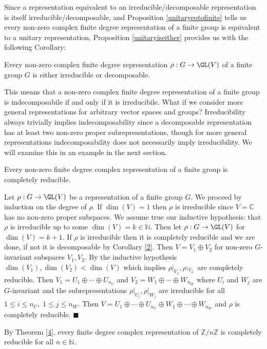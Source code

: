 \documentclass[../Project.tex]{subfiles}
\begin{document}
Since a representation equivalent to an irreducible/decomposable representation is itself irreducible/decomposable, and Proposition \ref{unitaryeqtofinite} tells us every non-zero complex finite degree representation of a finite group is equivalent to a unitary representation, Proposition \ref{unitaryiseither} provides us with the following Corollary: 
\begin{coro}[{\cite[Corollary 3.2.5]{1}}]
\label{2}
	Every non-zero complex finite degree representation $\rho : G \to \GL(V)$ of a finite group $G$ is either irreducible or decomposable.
\end{coro}
This means that a non-zero complex finite degree representation of a finite group is indecomposabile if and only if it is irreducibile. What if we consider more general representations for arbitrary vector spaces and groups?
Irreducibility always trivially implies indecomposability since a decomposable representation has at least two non-zero proper subrepresentations, though for more general representations indecomposability does not necessarily imply irreducibility. We will examine this in an example in the next section.\\

\begin{theo}[{\cite[Theorem 3.2.8]{1}}]
	Every non-zero finite degree complex representation of a finite group is completely reducible. \label{4}
\end{theo}
\begin{proo*}[{\cite[Theorem 3.2.8]{1}}]
	Let $\rho : G \to \GL(V)$ be a representation of a finite group $G$. We proceed by induction on the degree of $\rho$. If $\dim(V) = 1$ then $\rho$ is irreducible since $V = \mathbb{C}$ has no non-zero proper subspaces. We assume true our inductive hypothesis: that $\rho$ is irreducible up to some $\dim(V) = k \in \mathbb{N}$. Then let $\rho : G \to \GL(V)$ for $\dim(V) = k +1$. If $\rho$ is irreducible then it is completely reducible and we are done, if not it is decomposable by Corollary \ref{2}. Then $V = V_1 \oplus V_2$ for non-zero $G$-invariant subspaces $V_1,V_2$. By the inductive hypothesis $\dim(V_1),\dim(V_2)< \dim(V)$ which implies $\rho\vert_{V_1},\rho:_{V_2}$ are completely reducible. Then $V_1 = U_1 \oplus \cdots \oplus U_{n_U}$ and $V_2 = W_1 \oplus \cdots \oplus W_{n_W}$ where $U_i$ and $W_j$ are $G$-invariant and the subrepresentations $\rho\vert_{U_i},\rho\vert_{W_j}$ are irreducible for all $1 \leqslant i \leqslant n_U,\;1\leqslant j \leqslant n_W$. Then $V = U_1 \oplus \cdots \oplus U_{n_U} \oplus W_1 \oplus \cdots \oplus W_{n_W}$ and $\rho$ is completely reducible. \hfill$\blacksquare$
\end{proo*}

\begin{exam}
	By Theorem \ref{4}, every finite degree complex representation of $\mathbb{Z}/n\mathbb{Z}$ is completely reducible for all $n \in \mathbb{N}$.
\end{exam}
\end{document}

